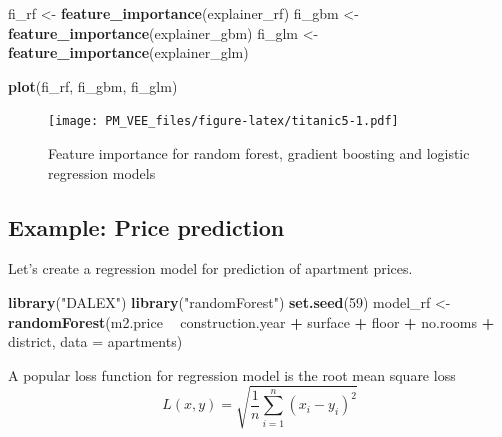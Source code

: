 \documentclass[]{krantz}
\newenvironment{Shaded}{\begin{snugshade}}{\end{snugshade}}
\newcommand{\DataTypeTok}[1]{\textcolor[rgb]{0.13,0.29,0.53}{#1}}
\newcommand{\DecValTok}[1]{\textcolor[rgb]{0.00,0.00,0.81}{#1}}
\newcommand{\KeywordTok}[1]{\textcolor[rgb]{0.13,0.29,0.53}{\textbf{#1}}}
\newcommand{\NormalTok}[1]{#1}
\newcommand{\OperatorTok}[1]{\textcolor[rgb]{0.81,0.36,0.00}{\textbf{#1}}}
\newcommand{\StringTok}[1]{\textcolor[rgb]{0.31,0.60,0.02}{#1}}
\theoremstyle{definition}
\theoremstyle{definition}
\theoremstyle{definition}
\theoremstyle{remark}
\begin{document}
\begin{Shaded}
\begin{Highlighting}[]
\NormalTok{fi_rf <-}\StringTok{ }\KeywordTok{feature_importance}\NormalTok{(explainer_rf)}
\NormalTok{fi_gbm <-}\StringTok{ }\KeywordTok{feature_importance}\NormalTok{(explainer_gbm)}
\NormalTok{fi_glm <-}\StringTok{ }\KeywordTok{feature_importance}\NormalTok{(explainer_glm)}

\KeywordTok{plot}\NormalTok{(fi_rf, fi_gbm, fi_glm)}
\end{Highlighting}
\end{Shaded}

\begin{figure}
\centering
\texttt{[image: PM\_VEE\_files/figure-latex/titanic5-1.pdf]}
\caption{\label{fig:titanic5}Feature importance for random forest, gradient
boosting and logistic regression models}
\end{figure}

\hypertarget{example-price-prediction}{%
\subsection{Example: Price prediction}\label{example-price-prediction}}

Let's create a regression model for prediction of apartment prices.

\begin{Shaded}
\begin{Highlighting}[]
\KeywordTok{library}\NormalTok{(}\StringTok{"DALEX"}\NormalTok{)}
\KeywordTok{library}\NormalTok{(}\StringTok{"randomForest"}\NormalTok{)}
\KeywordTok{set.seed}\NormalTok{(}\DecValTok{59}\NormalTok{)}
\NormalTok{model_rf <-}\StringTok{ }\KeywordTok{randomForest}\NormalTok{(m2.price }\OperatorTok{~}\StringTok{ }\NormalTok{construction.year }\OperatorTok{+}\StringTok{ }\NormalTok{surface }\OperatorTok{+}\StringTok{ }\NormalTok{floor }\OperatorTok{+}\StringTok{ }
\StringTok{                           }\NormalTok{no.rooms }\OperatorTok{+}\StringTok{ }\NormalTok{district, }\DataTypeTok{data =}\NormalTok{ apartments)}
\end{Highlighting}
\end{Shaded}

A popular loss function for regression model is the root mean square
loss \[
  L(x, y) = \sqrt{\frac1n \sum_{i=1}^n (x_i - y_i)^2}
\]

\begin{Shaded}
\end{Shaded}
\end{document}
